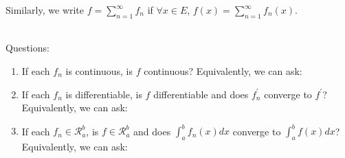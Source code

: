 \documentclass{book}
\newcommand{\exOne}{%
   \color{Purple}%
   \fontsize{14}{16}\selectfont%
}
\newcommand{\mySepTwo}[1][.]{%
   {\noindent\color{#1}{\rule{6.5in}{0.5mm}}}\\%
}
\newcommand{\retTwo}{\hfill\bigbreak}
\begin{document}
Similarly, we write $f = \sum\limits_{n=1}^\infty f_n$\hspace{0.1em} if \hspace{0.1em}$\forall x \in E$,\hspace{0.4em} $f(x) = \sum\limits_{n=1}^\infty f_n(x)$.\retTwo

\exOne
\mySepTwo

Questions:
\begin{enumerate}
   \item If each $f_n$ is continuous, is $f$ continuous? Equivalently, we can ask:\\ [-17pt]
   
   { \retTwo\par}

   \item If each $f_n$ is differentiable, is $f$ differentiable and does $f_n^\prime$ converge to $f^\prime$?\\ Equivalently, we can ask:\\ [-17pt]
   
   { \retTwo\par}

   \item If each $f_n \in \mathscr{R}_a^b$, is $f \in \mathscr{R}_a^b$ and does $\int_a^b f_n(x)dx$ converge to $\int_a^b f(x)dx$?\\ Equivalently, we can ask:\\ [-17pt]
   
   { \retTwo\par}
\end{enumerate}
\end{document}
